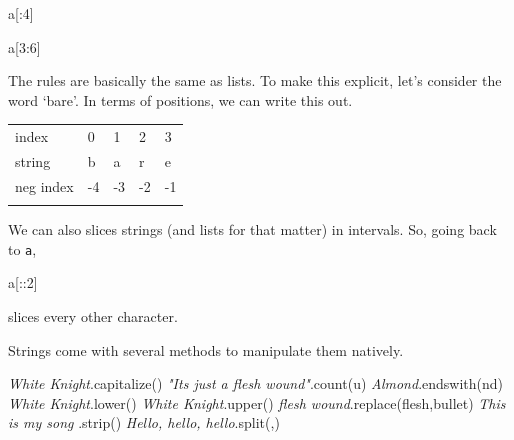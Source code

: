 \documentclass[
  letterpaper,
]{scrbook}
\newenvironment{Shaded}{\begin{snugshade}}{\end{snugshade}}
\newcommand{\CommentTok}[1]{\textcolor[rgb]{0.56,0.35,0.01}{\textit{#1}}}
\newcommand{\DecValTok}[1]{\textcolor[rgb]{0.00,0.00,0.81}{#1}}
\newcommand{\NormalTok}[1]{#1}
\newcommand{\StringTok}[1]{\textcolor[rgb]{0.31,0.60,0.02}{#1}}
\begin{document}
\begin{Shaded}
\begin{Highlighting}[]
\NormalTok{a[:}\DecValTok{4}\NormalTok{]}
\end{Highlighting}
\end{Shaded}

\begin{Shaded}
\begin{Highlighting}[]
\NormalTok{a[}\DecValTok{3}\NormalTok{:}\DecValTok{6}\NormalTok{]}
\end{Highlighting}
\end{Shaded}

The rules are basically the same as lists. To make this explicit, let's consider the word `bare'.
In terms of positions, we can write this out.

\begin{longtable}[]{@{}lllll@{}}
\toprule
\endhead
index & 0 & 1 & 2 & 3\tabularnewline
string & b & a & r & e\tabularnewline
neg index & -4 & -3 & -2 & -1\tabularnewline
& & & &\tabularnewline
\bottomrule
\end{longtable}

We can also slices strings (and lists for that matter) in intervals. So, going back to \texttt{a},

\begin{Shaded}
\begin{Highlighting}[]
\NormalTok{a[::}\DecValTok{2}\NormalTok{]}
\end{Highlighting}
\end{Shaded}

slices every other character.

Strings come with several methods to manipulate them natively.

\begin{Shaded}
\begin{Highlighting}[]
\CommentTok{\textquotesingle{}White Knight\textquotesingle{}}\NormalTok{.capitalize()}
\CommentTok{"It\textquotesingle{}s just a flesh wound"}\NormalTok{.count(}\StringTok{\textquotesingle{}u\textquotesingle{}}\NormalTok{)}
\CommentTok{\textquotesingle{}Almond\textquotesingle{}}\NormalTok{.endswith(}\StringTok{\textquotesingle{}nd\textquotesingle{}}\NormalTok{)}
\CommentTok{\textquotesingle{}White Knight\textquotesingle{}}\NormalTok{.lower()}
\CommentTok{\textquotesingle{}White Knight\textquotesingle{}}\NormalTok{.upper()}
\CommentTok{\textquotesingle{}flesh wound\textquotesingle{}}\NormalTok{.replace(}\StringTok{\textquotesingle{}flesh\textquotesingle{}}\NormalTok{,}\StringTok{\textquotesingle{}bullet\textquotesingle{}}\NormalTok{)}
\CommentTok{\textquotesingle{} This is my song   \textquotesingle{}}\NormalTok{.strip()}
\CommentTok{\textquotesingle{}Hello, hello, hello\textquotesingle{}}\NormalTok{.split(}\StringTok{\textquotesingle{},\textquotesingle{}}\NormalTok{)}
\end{Highlighting}
\end{Shaded}
\end{document}
